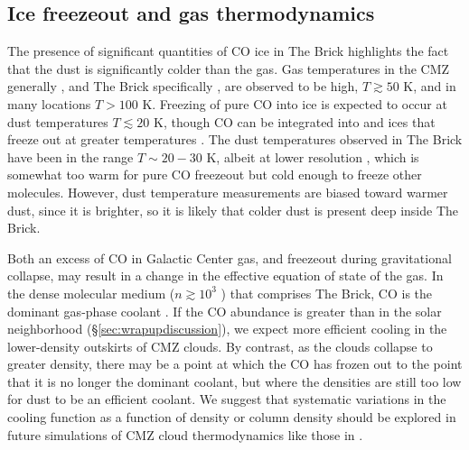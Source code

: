 \documentclass[times,astrosymb,twocolumn]{aastex631}
\def\todo#1{\textcolor{red}{#1}}
\def\rr#1{#1}
\begin{document}
\subsection{Ice freezeout and gas thermodynamics}
\label{sec:thermodynamics}

The presence of significant quantities of CO ice in The Brick highlights the fact that the dust is significantly colder than the gas.
Gas temperatures in the CMZ generally \citep{Ginsburg2016,Krieger2017}, and The Brick specifically \citep{Johnston2014}, are observed to be high, $T\gtrsim50$ K, and in many locations $T>100$ K.
Freezing of pure CO into ice is expected to occur at dust temperatures $T\lesssim20$ K, though CO can be integrated into \water and \methanol ices that freeze out at \rr{greater} temperatures  \citep[$T\gtrsim80$ K;][]{Boogert2015,Garrod2006}.
The dust temperatures observed in The Brick have been in the range $T\sim20-30$ K, albeit at lower resolution \citep{Marsh2016,Tang2021}, which is somewhat too warm for pure CO freezeout but cold enough to freeze other molecules.
However, dust temperature measurements are biased toward warmer dust, since it is brighter, so it is likely that colder dust is present deep inside The Brick.


Both an excess of CO in Galactic Center gas, and freezeout during gravitational collapse, may result in a change in the effective equation of state of the gas.
In the dense molecular medium ($n\gtrsim10^3$ \percc) that comprises The Brick, CO is the dominant gas-phase coolant \citep{Ginsburg2016}.
If the CO abundance is \rr{greater} than in the solar neighborhood (\S \ref{sec:wrapupdiscussion}), we expect more efficient cooling in the lower-density outskirts of CMZ clouds.
By contrast, as the clouds collapse to \rr{greater} density, there may be a point at which the CO has frozen out to the point that it is no longer the dominant coolant, but where the densities are still too low for dust to be \rr{an} efficient \rr{coolant}.
We suggest that \rr{systematic} variations in the cooling function \rr{as a function of density or column density} should be explored in future simulations of CMZ cloud thermodynamics like those in \citet{Clark2013}.
\end{document}
